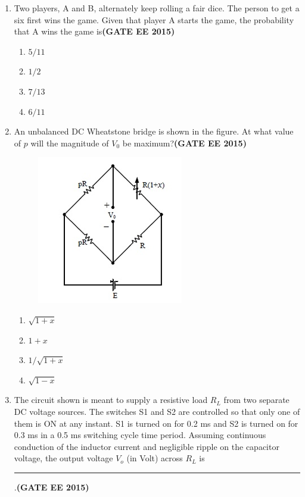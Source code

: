 \documentclass[a4paper,12pt]{exam}
\theoremstyle{remark}
\begin{document}
\begin{enumerate}
\item Two players, A and B, alternately keep rolling a fair dice. The person to get a six first wins the game. Given that player A starts the game, the probability that A wins the game is\hfill{\textbf{(GATE EE 2015)}}
\begin{multicols}{4}
        \begin{enumerate}
        \item $5/11$
        \item $1/2$
        \item $7/13$
        \item $6/11$
    \end{enumerate}
\end{multicols}

\item An unbalanced DC Wheatstone bridge is shown in the figure. At what value of $p$ will the magnitude of $V_0$ be maximum?\hfill{\textbf{(GATE EE 2015)}}
\begin{figure}[H]
    \centering
    \includegraphics[width=0.4\columnwidth]{figs/Q 40.png}
    \caption{}
    \label{fig:placeholder}
\end{figure}
\begin{multicols}{4}
    \begin{enumerate}
        \item $\sqrt{1 + x}$
        \item $1 + x$
        \item $1 / \sqrt{1 + x}$
        \item $\sqrt{1 - x}$
    \end{enumerate}
\end{multicols}
\item The circuit shown is meant to supply a resistive load $R_L$ from two separate DC voltage sources. The switches S1 and S2 are controlled so that only one of them is ON at any instant. S1 is turned on for 0.2 ms and S2 is turned on for 0.3 ms in a 0.5 ms switching cycle time period. Assuming continuous conduction of the inductor current and negligible ripple on the capacitor voltage, the output voltage $V_o$ (in Volt) across $R_L$ is \rule{3cm}{0.15mm}.\hfill{\textbf{(GATE EE 2015)}}

\end{enumerate}
\end{document}
